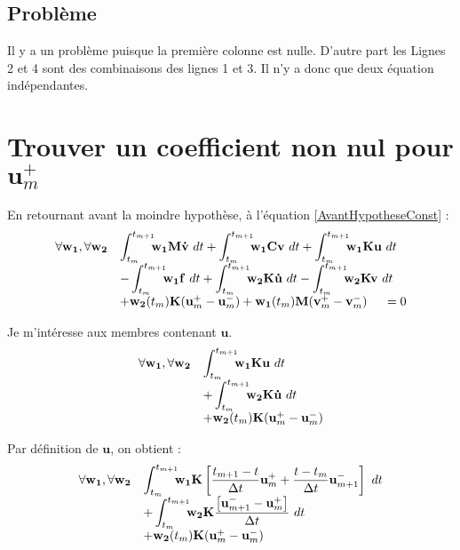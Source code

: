 \documentclass[12pt,a4paper]{report}
\begin{document}
\subsection{Problème}
Il y a un problème puisque la première colonne est nulle. D'autre part les Lignes 2 et 4 sont des combinaisons des lignes 1 et 3. Il n'y a donc que deux équation indépendantes.

\section{Trouver un coefficient non nul pour $\mathbf{u}_m^+$}
En retournant avant la moindre hypothèse, à l'équation \ref{AvantHypotheseConst} :
\begin{equation}
\begin{array}{r l}
	\forall \mathbf{w_1},\forall \mathbf{w_2}
	&\displaystyle
	 \int_{t_m}^{t_{m+1}} \!\!\! 	\mathbf{w_1}
		\mathbf{M}\mathbf{\dot{v}} ~dt
	 +\int_{t_m}^{t_{m+1}} \!\!\! 	\mathbf{w_1}
		\mathbf{C}\mathbf{v} ~dt
	 +\int_{t_m}^{t_{m+1}} \!\!\! 	\mathbf{w_1}
		\mathbf{K}\mathbf{u} ~dt
	\\
	  &\displaystyle
	   - \int_{t_m}^{t_{m+1}} \!\!\! 	\mathbf{w_1}
			\mathbf{f} ~dt		
	   + \int_{t_m}^{t_{m+1}} \!\!\! 
	    	\mathbf{w_2} \mathbf{K}\mathbf{\dot{u}}~dt 
	    -\int_{t_m}^{t_{m+1}} \!\!\! 
	    	\mathbf{w_2} \mathbf{K}     \mathbf{v} ~dt
	\\
	  &+ \mathbf{w_2}(t_m) \mathbf{K} (\mathbf{u}_m^+ - \mathbf{u}_m^-)
	   +  \mathbf{w_1}(t_m) \mathbf{M}(\mathbf{v}_m^+ - \mathbf{v}_m^-)
	~~~~=0
\end{array}
\end{equation}

Je m'intéresse aux membres contenant $\mathbf{u}$.
\begin{equation}
\begin{array}{r l}
	\forall \mathbf{w_1},\forall \mathbf{w_2}
	&\displaystyle
	 \int_{t_m}^{t_{m+1}} \!\!\! 	\mathbf{w_1}
		\mathbf{K}\mathbf{u} ~dt
	\\
	  &\displaystyle	
	   + \int_{t_m}^{t_{m+1}} \!\!\! 
	    	\mathbf{w_2} \mathbf{K}\mathbf{\dot{u}}~dt 
	\\
	  &+ \mathbf{w_2}(t_m) \mathbf{K} (\mathbf{u}_m^+ - \mathbf{u}_m^-)
\end{array}
\end{equation}

Par définition de $\mathbf{u}$, on obtient :
\begin{equation}
\begin{array}{r l}
	\forall \mathbf{w_1},\forall \mathbf{w_2}
	&\displaystyle
	 \int_{t_m}^{t_{m+1}} \!\!\! 	\mathbf{w_1}
		\mathbf{K} \left[
			\frac{t_{m+1}-t}{\Delta t} \mathbf{u}_m^+ + 
			\frac{t-t_m}{\Delta t} \mathbf{u}_{m+1}^- 
			\right] ~dt
	\\
	  &\displaystyle	
	   + \int_{t_m}^{t_{m+1}} \!\!\! 
	    	\mathbf{w_2} \mathbf{K} 
	    			\frac{\left[ \mathbf{u}_{m+1}^- 
	    				 - \mathbf{u}_m^+ \right]  }{\Delta t}	~dt 
	\\
	  &+ \mathbf{w_2}(t_m) \mathbf{K} (\mathbf{u}_m^+ - \mathbf{u}_m^-)
\end{array}
\end{equation}
\end{document}
